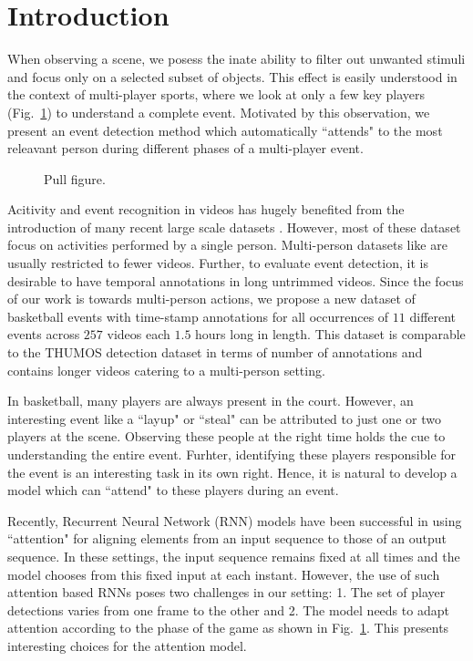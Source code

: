 
\section{Introduction}

When observing a scene, we posess the inate ability to filter out unwanted
stimuli \cite{Desimone_ARN95} and focus only on a selected subset of objects.
This effect is easily understood in the context of multi-player sports, where
we look at only a few key players (Fig.~\ref{fig:pull_figure}) to understand a
complete event. Motivated by this observation, we present an event detection
method which automatically ``attends" to the most releavant person during
different phases of a multi-player event.

\begin{figure}[ht!]
\begin{center}
\fbox{\rule{0pt}{2in} \rule{.9\linewidth}{0pt}}
\end{center}
   \caption{Pull figure.}
\label{fig:pull_figure}
\end{figure}

Acitivity and event recognition in videos has hugely benefited from the
introduction of many recent large scale datasets \cite{}. However, most of
these dataset focus on activities performed by a single person.  Multi-person
datasets like \cite{} are usually restricted to fewer videos.  Further, to
evaluate event detection, it is desirable to have temporal annotations in long
untrimmed videos. Since the focus of our work is towards multi-person actions,
we propose a new dataset of basketball events with time-stamp annotations for
all occurrences of $11$ different events across $257$ videos each $1.5$ hours
long in length.  This dataset is comparable to the THUMOS \cite{THUMOS}
detection dataset in terms of number of annotations and contains longer videos
catering to a multi-person setting.

In basketball, many players are always present in the court.
However, an interesting event like a ``layup" or ``steal" can be attributed
to just one or two players at the scene. Observing these people at the right
time holds the cue to understanding the entire event. Furhter, identifying
these players responsible for the event is an interesting task in its own right.
Hence, it is natural to develop a model which can ``attend" to these players during
an event.

Recently, Recurrent Neural Network (RNN) models have been successful in
using ``attention" \cite{Bahdnau_arxiv14,Xu_arxiv15,Yao_arxiv15} for aligning
elements from an input sequence to those of an output sequence. In these settings,
the input sequence remains fixed at all times and the model chooses from this
fixed input at each instant. However, the use of such attention based RNNs
poses two challenges in our setting:
1. The set of player detections varies from one frame to the other and
2. The model needs to adapt attention according to the phase of the game as
shown in Fig.~\ref{fig:pull_figure}. This presents interesting choices
for the attention model.

